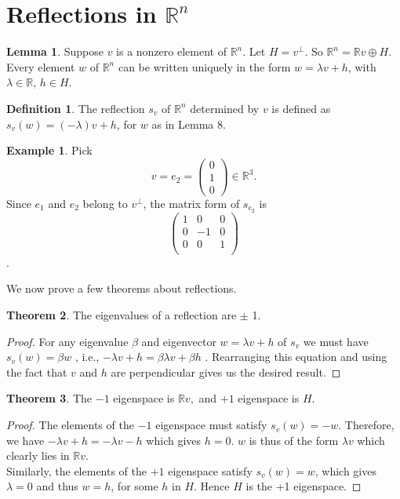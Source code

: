 \documentclass[11pt]{report}
\theoremstyle{plain}
\theoremstyle{definition}
\newtheorem{defn}{Definition}
\newtheorem{exmp}{Example} %
\newtheorem{theorem}{Theorem}
\newtheorem{lemma}[theorem]{Lemma}
\begin{document}
\section{Reflections in $\mathbb{R}^n$}
\begin{lemma}
	Suppose $ v $ is a nonzero element of $ \mathbb{R}^n $. Let $ H = v^\bot $. So $ \mathbb{R}^n = \mathbb{R}v \oplus H.$ Every element $ w $ of $ \mathbb{R}^n $ can be written uniquely in the form $ w = \lambda v + h $, with $ \lambda \in \mathbb{R} $, $ h\in H $. 
\end{lemma}
\begin{defn}
	The reflection $ s_v $ of $ \mathbb{R}^n $ determined by $ v $ is defined as $ s_v (w) = (-\lambda)v + h$, for $ w $ as in Lemma 8. 
\end{defn}
\begin{exmp}
Pick $$ v = e_2 = \begin{pmatrix}
0 \\
1 \\
0 
\end{pmatrix} \in \mathbb{R}^3.$$ Since $ e_1 $ and $ e_2 $ belong to $ v^\bot $, the matrix form of $ s_{e_2}  $ is 
$$ \begin{pmatrix}
1 & 0 & 0\\
0 & -1 & 0 \\
0 & 0 & 1\\
\end{pmatrix} $$.\\	
\end{exmp} 
We now prove a few theorems about reflections.
\begin{theorem}
	The eigenvalues of a reflection are $ \pm $ 1.
\end{theorem} 
	\begin{proof}
		For any eigenvalue $ \beta $ and eigenvector $ w = \lambda v + h $ of $ s_v $ we must have $ s_v (w) = \beta w $ , i.e., $-\lambda v + h = \beta \lambda v + \beta h $ . Rearranging this equation and using the fact that $ v $ and $ h $ are perpendicular gives us the desired result.
	\end{proof}
	\begin{theorem}
 The $ -1 $ eigenspace is $ \mathbb{R}v, $ and $ +1 $ eigenspace is $ H $.

	\end{theorem}
	\begin{proof}
		The elements of the $ -1 $ eigenspace must satisfy $ s_v (w) = -w  $. Therefore, we have $ -\lambda v + h = -\lambda v - h  $ which gives $ h =0. $ $ w $ is thus of the form  $ \lambda v $ which clearly lies in $ \mathbb{R}v.$\\
		Similarly, the elements of the $ +1 $ eigenspace satisfy $ s_v (w) = w  $, which gives $ \lambda =0 $ and thus $ w = h $, for some $ h $ in $ H $. Hence $ H $ is the +1 eigenspace.
	\end{proof}
\end{document}
